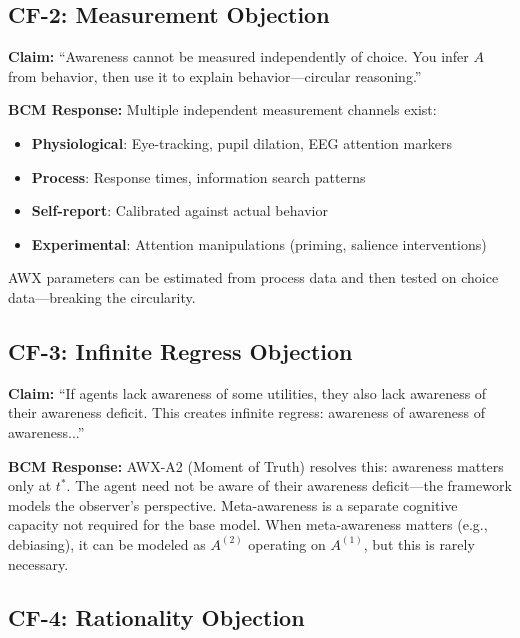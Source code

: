 \subsection{CF-2: Measurement Objection}

\begin{tcolorbox}[colback=red!5!white, colframe=red!75!black, title=Objection]
\textbf{Claim:} ``Awareness cannot be measured independently of choice. You infer $A$ from behavior, then use it to explain behavior---circular reasoning.''
\end{tcolorbox}

\textbf{BCM Response:} Multiple independent measurement channels exist:
\begin{itemize}[nosep]
    \item \textbf{Physiological}: Eye-tracking, pupil dilation, EEG attention markers
    \item \textbf{Process}: Response times, information search patterns
    \item \textbf{Self-report}: Calibrated against actual behavior
    \item \textbf{Experimental}: Attention manipulations (priming, salience interventions)
\end{itemize}
AWX parameters can be estimated from process data and then tested on choice data---breaking the circularity.

\subsection{CF-3: Infinite Regress Objection}

\begin{tcolorbox}[colback=red!5!white, colframe=red!75!black, title=Objection]
\textbf{Claim:} ``If agents lack awareness of some utilities, they also lack awareness of their awareness deficit. This creates infinite regress: awareness of awareness of awareness...''
\end{tcolorbox}

\textbf{BCM Response:} AWX-A2 (Moment of Truth) resolves this: awareness matters only at $t^*$. The agent need not be aware of their awareness deficit---the framework models the observer's perspective. Meta-awareness is a separate cognitive capacity not required for the base model. When meta-awareness matters (e.g., debiasing), it can be modeled as $A^{(2)}$ operating on $A^{(1)}$, but this is rarely necessary.

\subsection{CF-4: Rationality Objection}

